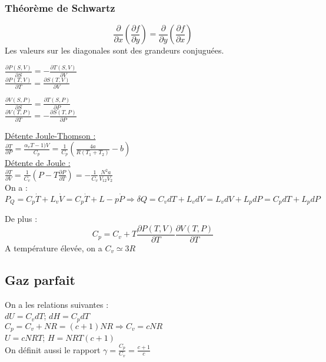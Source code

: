 \documentclass[../main.tex]{subfiles}
\begin{document}
\subsubsection{Théorème de Schwartz}
\begin{equation}
    \frac{\partial}{\partial x} (\frac{\partial f}{\partial y}) = \frac{\partial}{\partial y} (\frac{\partial f}{\partial x})
\end{equation}
Les valeurs sur les diagonales sont des grandeurs conjuguées.\\
\begin{minipage}{.5\textwidth}
    $\frac{\partial P(S,V)}{\partial S} = -\frac{\partial T(S,V)}{\partial V}$\\
    $\frac{\partial P(T,V)}{\partial T} = \frac{\partial S(T,V)}{\partial V}$\\
\end{minipage}
\begin{minipage}{.5\textwidth}
    $\frac{\partial V(S,P)}{\partial S} = \frac{\partial T(S,P)}{\partial P}$\\
    $\frac{\partial V(T,P)}{\partial T} = -\frac{\partial S(T,P)}{\partial P}$\\
\end{minipage}

\quad \underline{Détente Joule-Thomson :}\\
$\frac{\partial T}{\partial P} = \frac{\alpha_vT-1)V}{C_p} = \frac{1}{C_p}(\frac{4a}{R(T_1+T_2)}-b)$\\

\quad \underline{Détente de Joule :}\\
$\frac{\partial T}{\partial V} = \frac{1}{C_v}(P-T\frac{\partial P}{\partial T}) = -\frac{1}{C_v} \frac{N^2a}{V_12V_2}$\\

On a : \\
\begin{equation}
    P_Q = C_p \dot{T} + L_v \dot{V} = C_p \dot{T} + L-p \dot{P} \Rightarrow \delta Q = C_v dT + L_v dV = L_vdV + L_p dP = C_pdT + L_pdP
\end{equation}

De plus : \\
\begin{equation}
    C_p = C_v + T\frac{\partial P(T,V)}{\partial T} \frac{\partial V(T,P)}{\partial T}
\end{equation}
A température élevée, on a $C_v \simeq 3R$\\


\subsection{Gaz parfait}
On a les relations suivantes :\\
$dU = C_v dT$; $dH = C_pdT$\\
$C_p = C_v + NR = (c+1)NR \Rightarrow C_v = cNR$\\
$U = cNRT$; $H = NRT(c+1)$\\
On définit aussi le rapport $\gamma = \frac{C_p}{C_v} = \frac{c+1}{c}$\\
\end{document}
